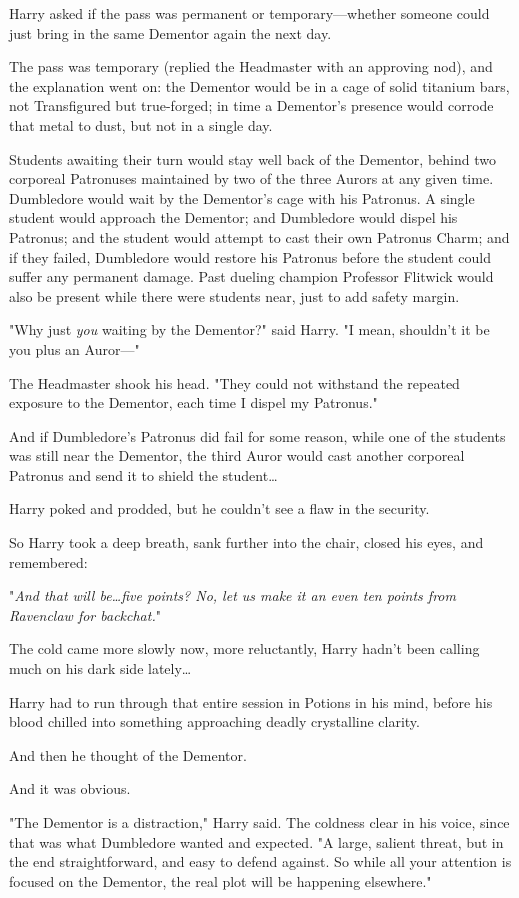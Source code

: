 Harry asked if the pass was permanent or temporary—whether someone could just
bring in the same Dementor again the next day.

The pass was temporary (replied the Headmaster with an approving nod), and the
explanation went on: the Dementor would be in a cage of solid titanium bars,
not Transfigured but true-forged; in time a Dementor’s presence would corrode
that metal to dust, but not in a single day.

Students awaiting their turn would stay well back of the Dementor, behind two
corporeal Patronuses maintained by two of the three Aurors at any given time.
Dumbledore would wait by the Dementor’s cage with his Patronus. A single
student would approach the Dementor; and Dumbledore would dispel his Patronus;
and the student would attempt to cast their own Patronus Charm; and if they
failed, Dumbledore would restore his Patronus before the student could suffer
any permanent damage. Past dueling champion Professor Flitwick would also be
present while there were students near, just to add safety margin.

"Why just \emph{you} waiting by the Dementor?" said Harry. "I mean, shouldn’t
it be you plus an Auror—"

The Headmaster shook his head. "They could not withstand the repeated exposure
to the Dementor, each time I dispel my Patronus."

And if Dumbledore’s Patronus did fail for some reason, while one of the
students was still near the Dementor, the third Auror would cast another
corporeal Patronus and send it to shield the student…

Harry poked and prodded, but he couldn’t see a flaw in the security.

So Harry took a deep breath, sank further into the chair, closed his eyes, and
remembered:

"\emph{And that will be…five points? No, let us make it an even ten
points from Ravenclaw for backchat.}"

The cold came more slowly now, more reluctantly, Harry hadn’t been calling much
on his dark side lately…

Harry had to run through that entire session in Potions in his mind, before his
blood chilled into something approaching deadly crystalline clarity.

And then he thought of the Dementor.

And it was obvious.

"The Dementor is a distraction," Harry said. The coldness clear in his voice,
since that was what Dumbledore wanted and expected. "A large, salient threat,
but in the end straightforward, and easy to defend against. So while all your
attention is focused on the Dementor, the real plot will be happening
elsewhere."

